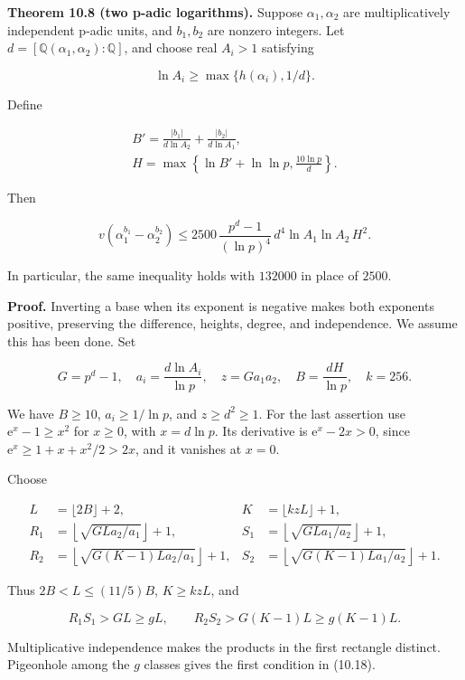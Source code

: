 \documentclass[
  11pt,
  a4paper,
]{article}
\begin{document}
\textbf{Theorem 10.8 (two p-adic logarithms).} Suppose
\(\alpha_1,\alpha_2\) are multiplicatively independent p-adic units, and
\(b_1,b_2\) are nonzero integers. Let
\(d=[\mathbb Q(\alpha_1,\alpha_2):\mathbb Q]\), and choose real
\(A_i>1\) satisfying

\[
\ln A_i\ge\max\{h(\alpha_i),1/d\}.
\]

Define

\[
\begin{gathered}
B'=\frac{|b_1|}{d\ln A_2}+\frac{|b_2|}{d\ln A_1},\\
H=\max\left\{\ln B'+\ln\ln p,\frac{10\ln p}d\right\}.
\end{gathered}
\tag{10.21}
\]

Then

\[
v(\alpha_1^{b_1}-\alpha_2^{b_2})
\le2500\,\frac{p^d-1}{(\ln p)^4}\,
d^4\ln A_1\ln A_2\,H^2.
\tag{10.22}
\]

In particular, the same inequality holds with \(132000\) in place of
\(2500\).

\textbf{Proof.} Inverting a base when its exponent is negative makes
both exponents positive, preserving the difference, heights, degree, and
independence. We assume this has been done. Set

\[
G=p^d-1,\quad a_i=\frac{d\ln A_i}{\ln p},\quad
z=Ga_1a_2,\quad B=\frac{dH}{\ln p},\quad k=256.
\tag{10.23}
\]

We have \(B\ge10\), \(a_i\ge1/\ln p\), and \(z\ge d^2\ge1\). For the
last assertion use \(\mathrm e^x-1\ge x^2\) for \(x\ge0\), with
\(x=d\ln p\). Its derivative is \(\mathrm e^x-2x>0\), since
\(\mathrm e^x\ge1+x+x^2/2>2x\), and it vanishes at \(x=0\).

Choose

\[
\begin{aligned}
L&=\lfloor2B\rfloor+2,& K&=\lfloor k z L\rfloor+1,\\
R_1&=\left\lfloor\sqrt{GL a_2/a_1}\right\rfloor+1,&
S_1&=\left\lfloor\sqrt{GL a_1/a_2}\right\rfloor+1,\\
R_2&=\left\lfloor\sqrt{G(K-1)L a_2/a_1}\right\rfloor+1,&
S_2&=\left\lfloor\sqrt{G(K-1)L a_1/a_2}\right\rfloor+1.
\end{aligned}
\tag{10.24}
\]

Thus \(2B<L\le(11/5)B\), \(K\ge k z L\), and

\[
R_1S_1>GL\ge gL,\qquad
R_2S_2>G(K-1)L\ge g(K-1)L.
\tag{10.25}
\]

Multiplicative independence makes the products in the first rectangle
distinct. Pigeonhole among the \(g\) classes gives the first condition
in (10.18).
\end{document}
